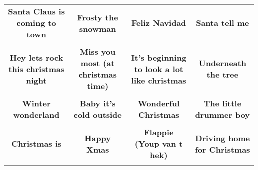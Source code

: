 \documentclass[12pt]{article} \usepackage{eso-pic, graphicx}
\newcommand{\background}[1]{%
\AddToShipoutPictureBG*{\texttt{[image: \#1]}}
}
\begin{document}
\tabcolsep=30.2pt \renewcommand{\arraystretch}{4.5}   \vspace*{4.3cm} \begin{center}  \begin{tabular}{c c c c}
\parbox{3cm}{\centering \textbf{Santa Claus is coming to town}}& 
\parbox{3cm}{\centering \textbf{Frosty the snowman}}& 
\parbox{3cm}{\centering \textbf{Feliz Navidad}}& 
\parbox{3cm}{\centering \textbf{Santa tell me}}\\ \\ 
\parbox{3cm}{\centering \textbf{Hey lets rock this christmas night}}& 
\parbox{3cm}{\centering \textbf{Miss you most (at christmas time)}}& 
\parbox{3cm}{\centering \textbf{It’s beginning to look a lot like christmas}}& 
\parbox{3cm}{\centering \textbf{Underneath the tree}}\\ \\ 
\parbox{3cm}{\centering \textbf{Winter wonderland}}& 
\parbox{3cm}{\centering \textbf{Baby it’s cold outside}}& 
\parbox{3cm}{\centering \textbf{Wonderful Christmas}}& 
\parbox{3cm}{\centering \textbf{The little drummer boy}}\\ \\ 
\parbox{3cm}{\centering \textbf{Christmas is}}& 
\parbox{3cm}{\centering \textbf{Happy Xmas}}& 
\parbox{3cm}{\centering \textbf{Flappie (Youp van t hek)}}& 
\parbox{3cm}{\centering \textbf{Driving home for Christmas}}\\ \\ 
\end{tabular} \background{discobingo.pdf} \end{center} 
\end{document}
